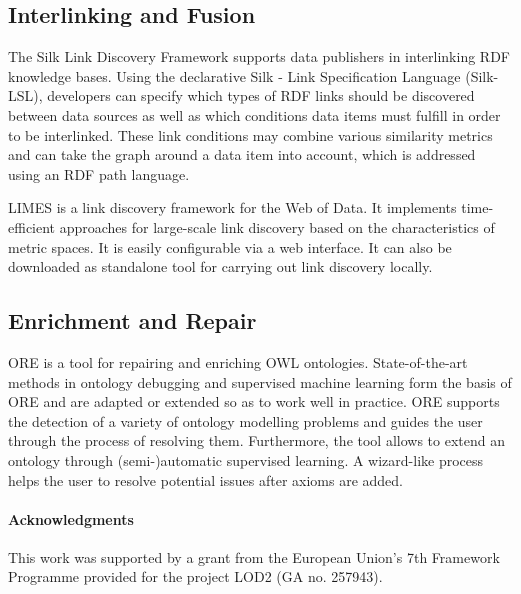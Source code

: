 \documentclass[a4paper, 11pt]{llncs}
\begin{document}
\subsection{Interlinking and Fusion}

The Silk Link Discovery Framework \cite{silk} supports data publishers in interlinking RDF knowledge bases.
Using the declarative Silk - Link Specification Language (Silk-LSL), developers can specify which types of RDF links should be discovered between data sources as well as which conditions data items must fulfill in order to be interlinked.
These link conditions may combine various similarity metrics and can take the graph around a data item into account, which is addressed using an RDF path language.

LIMES \cite{limes} is a link discovery framework for the Web of Data.
It implements time-efficient approaches for large-scale link discovery based on the characteristics of metric spaces.
It is easily configurable via a web interface. It can also be downloaded as standalone tool for carrying out link discovery locally.

\subsection{Enrichment and Repair}

ORE \cite{lehmann-2010-iswc} is a tool for repairing and enriching OWL ontologies.
State-of-the-art methods in ontology debugging and supervised machine learning form
the basis of ORE and are adapted or extended so as to work well in practice.
ORE supports the detection of a variety of ontology modelling problems and guides
the user through the process of resolving them.
Furthermore, the tool allows to extend an ontology through (semi-)automatic supervised learning.
A wizard-like process helps the user to resolve potential issues after axioms are added.




\paragraph*{Acknowledgments}
This work was supported by a grant from the European Union's 7th Framework Programme provided for the project LOD2 (GA no. 257943).

\enlargethispage{2mm}



\end{document}

